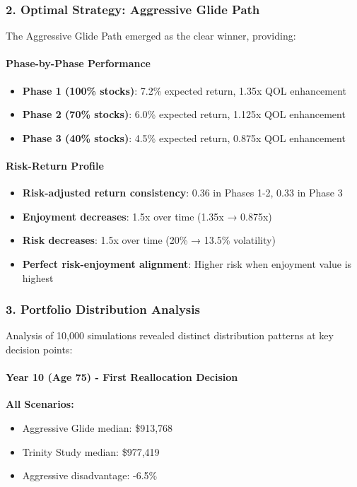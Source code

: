 \documentclass[11pt,letterpaper]{article}
\begin{document}
\subsubsection{2. Optimal Strategy: Aggressive Glide Path}

The Aggressive Glide Path emerged as the clear winner, providing:


\paragraph{Phase-by-Phase Performance}
\begin{itemize}
\item \textbf{Phase 1 (100\% stocks)}: 7.2\% expected return, 1.35x QOL enhancement
\item \textbf{Phase 2 (70\% stocks)}: 6.0\% expected return, 1.125x QOL enhancement
\item \textbf{Phase 3 (40\% stocks)}: 4.5\% expected return, 0.875x QOL enhancement
\end{itemize}

\paragraph{Risk-Return Profile}
\begin{itemize}
\item \textbf{Risk-adjusted return consistency}: 0.36 in Phases 1-2, 0.33 in Phase 3
\item \textbf{Enjoyment decreases}: 1.5x over time (1.35x → 0.875x)
\item \textbf{Risk decreases}: 1.5x over time (20\% → 13.5\% volatility)
\item \textbf{Perfect risk-enjoyment alignment}: Higher risk when enjoyment value is highest
\end{itemize}

\subsubsection{3. Portfolio Distribution Analysis}

Analysis of 10,000 simulations revealed distinct distribution patterns at key decision points:


\paragraph{Year 10 (Age 75) - First Reallocation Decision}
\textbf{All Scenarios:}

\begin{itemize}
\item Aggressive Glide median: \$913,768
\item Trinity Study median: \$977,419
\item Aggressive disadvantage: -6.5\%
\end{itemize}
\end{document}
